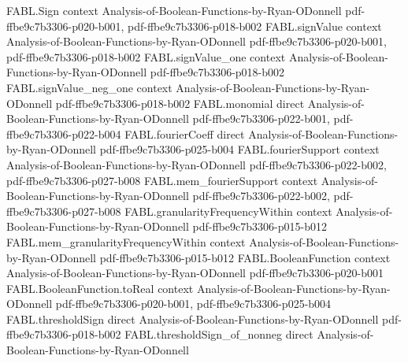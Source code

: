 \begin{theorem}
\label{FABL.sq_discreteDerivative_toReal_eq_self_of_monotone}
\leanok
{}
\proofstep
  {FABL.Sign}
  {context}
  {Analysis-of-Boolean-Functions-by-Ryan-ODonnell}
  {pdf-ffbe9c7b3306-p020-b001,
    pdf-ffbe9c7b3306-p018-b002}
\proofstep
  {FABL.signValue}
  {context}
  {Analysis-of-Boolean-Functions-by-Ryan-ODonnell}
  {pdf-ffbe9c7b3306-p020-b001,
    pdf-ffbe9c7b3306-p018-b002}
\proofstep
  {FABL.signValue_one}
  {context}
  {Analysis-of-Boolean-Functions-by-Ryan-ODonnell}
  {pdf-ffbe9c7b3306-p018-b002}
\proofstep
  {FABL.signValue_neg_one}
  {context}
  {Analysis-of-Boolean-Functions-by-Ryan-ODonnell}
  {pdf-ffbe9c7b3306-p018-b002}
\proofstep
  {FABL.monomial}
  {direct}
  {Analysis-of-Boolean-Functions-by-Ryan-ODonnell}
  {pdf-ffbe9c7b3306-p022-b001,
    pdf-ffbe9c7b3306-p022-b004}
\proofstep
  {FABL.fourierCoeff}
  {direct}
  {Analysis-of-Boolean-Functions-by-Ryan-ODonnell}
  {pdf-ffbe9c7b3306-p025-b004}
\proofstep
  {FABL.fourierSupport}
  {context}
  {Analysis-of-Boolean-Functions-by-Ryan-ODonnell}
  {pdf-ffbe9c7b3306-p022-b002,
    pdf-ffbe9c7b3306-p027-b008}
\proofstep
  {FABL.mem_fourierSupport}
  {context}
  {Analysis-of-Boolean-Functions-by-Ryan-ODonnell}
  {pdf-ffbe9c7b3306-p022-b002,
    pdf-ffbe9c7b3306-p027-b008}
\proofstep
  {FABL.granularityFrequencyWithin}
  {context}
  {Analysis-of-Boolean-Functions-by-Ryan-ODonnell}
  {pdf-ffbe9c7b3306-p015-b012}
\proofstep
  {FABL.mem_granularityFrequencyWithin}
  {context}
  {Analysis-of-Boolean-Functions-by-Ryan-ODonnell}
  {pdf-ffbe9c7b3306-p015-b012}
\proofstep
  {FABL.BooleanFunction}
  {context}
  {Analysis-of-Boolean-Functions-by-Ryan-ODonnell}
  {pdf-ffbe9c7b3306-p020-b001}
\proofstep
  {FABL.BooleanFunction.toReal}
  {context}
  {Analysis-of-Boolean-Functions-by-Ryan-ODonnell}
  {pdf-ffbe9c7b3306-p020-b001,
    pdf-ffbe9c7b3306-p025-b004}
\proofstep
  {FABL.thresholdSign}
  {direct}
  {Analysis-of-Boolean-Functions-by-Ryan-ODonnell}
  {pdf-ffbe9c7b3306-p018-b002}
\proofstep
  {FABL.thresholdSign_of_nonneg}
  {direct}
  {Analysis-of-Boolean-Functions-by-Ryan-ODonnell}

\end{theorem}

